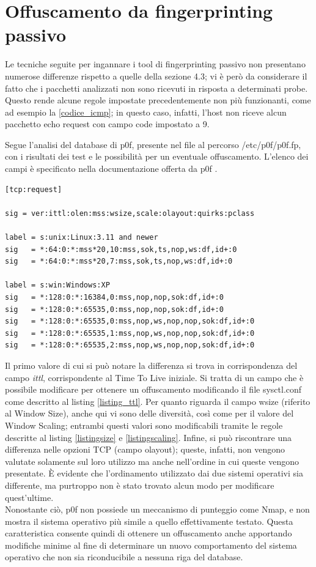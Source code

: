\section{Offuscamento da fingerprinting passivo}
Le tecniche seguite per ingannare i tool di fingerprinting passivo non presentano numerose differenze rispetto a quelle della sezione 4.3; vi è però da considerare il fatto che i pacchetti analizzati non sono ricevuti in risposta a determinati probe.
Questo rende alcune regole impostate precedentemente non più funzionanti, come ad esempio la \ref{codice_icmp}; in questo caso, infatti, l'host non riceve alcun pacchetto echo request con campo code impostato a 9.

Segue l'analisi del database di p0f, presente nel file al percorso /etc/p0f/p0f.fp, con i risultati dei test e le possibilità per un eventuale offuscamento. L'elenco dei campi è specificato nella documentazione offerta da p0f \cite{database_p0f}.
\begin{lstlisting}[caption={Fingerptinting TCP con p0f}]
[tcp:request]

sig = ver:ittl:olen:mss:wsize,scale:olayout:quirks:pclass

label = s:unix:Linux:3.11 and newer
sig   = *:64:0:*:mss*20,10:mss,sok,ts,nop,ws:df,id+:0
sig   = *:64:0:*:mss*20,7:mss,sok,ts,nop,ws:df,id+:0

label = s:win:Windows:XP
sig   = *:128:0:*:16384,0:mss,nop,nop,sok:df,id+:0
sig   = *:128:0:*:65535,0:mss,nop,nop,sok:df,id+:0
sig   = *:128:0:*:65535,0:mss,nop,ws,nop,nop,sok:df,id+:0
sig   = *:128:0:*:65535,1:mss,nop,ws,nop,nop,sok:df,id+:0
sig   = *:128:0:*:65535,2:mss,nop,ws,nop,nop,sok:df,id+:0
\end{lstlisting}

Il primo valore di cui si può notare la differenza si trova in corrispondenza del campo \textit{ittl}, corrispondente al Time To Live iniziale.
Si tratta di un campo che è possibile modificare per ottenere un offuscamento modificando il file sysctl.conf come descritto al listing \ref{listing_ttl}.
Per quanto riguarda il campo wsize (riferito al Window Size), anche qui vi sono delle diversità, così come per il valore del Window Scaling; entrambi questi valori sono modificabili tramite le regole descritte al listing \ref{listingsize} e \ref{listingscaling}.
Infine, si può riscontrare una differenza nelle opzioni TCP (campo olayout); queste, infatti, non vengono valutate solamente sul loro utilizzo ma anche nell'ordine in cui queste vengono presentate. È evidente che l'ordinamento utilizzato dai due sistemi operativi sia differente, ma purtroppo non è stato trovato alcun modo per modificare quest'ultime.\\
Nonostante ciò, p0f non possiede un meccanismo di punteggio come Nmap, e non mostra il sistema operativo più simile a quello effettivamente testato. Questa caratteristica consente quindi di ottenere un offuscamento anche apportando modifiche minime al fine di determinare un nuovo comportamento del sistema operativo che non sia riconducibile a nessuna riga del database.

